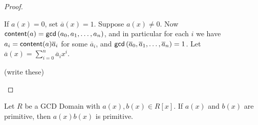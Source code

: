 \begin{proof}
\begin{inlineproplist}
\item If \(a(x) = 0\), set \(\overline{a}(x) = 1\).
Suppose \(a(x) \neq 0\).
Now \(\mathsf{content}(a) = \mathsf{gcd}\left(a_0,a_1,\ldots,a_n\right)\), and in particular for each \(i\) we have \(a_i = \mathsf{content}(a)\overline{a}_i\) for some \(\overline{a}_i\), and \(\mathsf{gcd}\left(\overline{a}_0, \overline{a}_1, \ldots, \overline{a}_n\right) = 1\).
Let \(\overline{a}(x) = \sum_{i=0}^n \overline{a}_i x^i\).

\item (write these)
\end{inlineproplist}
\end{proof}

\begin{prop} \label{prop:gauss-lemma-1}
Let \(R\) be a GCD Domain with \(a(x), b(x) \in R[x]\).
If \(a(x)\) and \(b(x)\) are primitive, then \(a(x)b(x)\) is primitive.
\end{prop}

